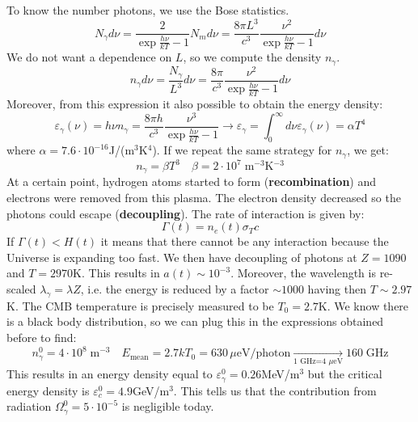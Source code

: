 \documentclass[10.75pt,a4paper,openright,bottom=2cm]{article}
\begin{document}
To know the number photons, we use the Bose statistics.
\[
N_\gamma d\nu=\frac{2}{\exp{\frac{h\nu}{kT}}-1}N_md\nu=\frac{8\pi L^3}{c^3}\frac{\nu^2}{\exp{\frac{h\nu}{kT}}-1}d\nu
\]
We do not want a dependence on $L$, so we compute the density $n_\gamma$.
\[
n_\gamma d\nu=\frac{N_\gamma}{L^3}d\nu=\frac{8\pi}{c^3}\frac{\nu^2}{\exp{\frac{h\nu}{kT}}-1}d\nu
\]
Moreover, from this expression it also possible to obtain the energy density:
\[
\varepsilon_\gamma(\nu)=h\nu n_\gamma=\frac{8\pi h}{c^3}\frac{\nu^3}{\exp{\frac{h\nu}{kT}}-1}\to\varepsilon_\gamma=\int_0^\infty d\nu\varepsilon_\gamma(\nu)=\alpha T^4
\]
where $\alpha=7.6\cdot10^{-16}$\;J/(m$^3$K$^4$). If we repeat the same strategy for $n_\gamma$, we get:
\[
n_\gamma=\beta T^3 \quad \beta=2\cdot10^7\;\text{m$^{-3}$K$^{-3}$}
\]
At a certain point, hydrogen atoms started to form (\textbf{recombination}) and electrons were removed from this plasma. The electron density decreased so the photons could escape (\textbf{decoupling}). The rate of interaction is given by:
\[
\Gamma(t)=n_e(t)\sigma_Tc
\]
If $\Gamma(t)<H(t)$ it means that there cannot be any interaction because the Universe is expanding too fast. We then have decoupling of photons at $Z=1090$ and $T=2970$\;K. This results in $a(t)\sim10^{-3}$. Moreover, the wavelength is re-scaled $\lambda_\gamma=\lambda Z$, i.e. the energy is reduced by a factor $\sim1000$ having then $T\sim2.97$\;K. The CMB temperature is precisely measured to be $T_0=2.7$\;K. We know there is a black body distribution, so we can plug this in the expressions obtained before to find:
\[
n_\gamma^0=4\cdot10^8\;\text{m$^{-3}$} \quad E_{\text{mean}}=2.7 kT_0=630\,\text{$\mu$eV/photon}\xrightarrow[\text{1 GHz=4 $\mu$eV}]{}160\;\text{GHz}
\]
This results in an energy density equal to $\varepsilon_\gamma^0=0.26$\;MeV/m$^3$ but the critical energy density is $\varepsilon_c^0=4.9$\;GeV/m$^3$. This tells us that the contribution from radiation $\Omega_\gamma^0=5\cdot10^{-5}$ is negligible today.
\end{document}
